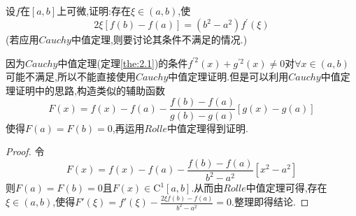 \documentclass[lang=cn,newtx,10pt,scheme=chinese]{elegantbook}
\begin{document}
\begin{exercise}
设\(f\)在\([a,b]\)上可微,证明:存在\(\xi\in(a,b)\),使
\begin{equation}
2\xi[f(b)-f(a)]=(b^{2}-a^{2})f^{\prime}(\xi)
    \nonumber
\end{equation}
(若应用$Cauchy$中值定理,则要讨论其条件不满足的情况.)
\begin{note}
    因为$Cauchy$中值定理(定理\ref{the:2.1})的条件$f^{\prime2}(x)+g^{\prime2}(x)\neq0$对$\forall x\in(a,b)$可能不满足,所以不能直接使用$Cauchy$中值定理证明.但是可以利用$Cauchy$中值定理证明中的思路,构造类似的辅助函数
    \begin{equation}
    F(x)=f(x)-f(a)-\frac{f(b)-f(a)}{g\left( b \right) -g\left( a \right)}\left[ g\left( x \right) -g\left( a \right) \right] 
        \nonumber
    \end{equation}
    使得$F(a)=F(b)=0$,再运用$Rolle$中值定理得到证明.
\end{note}
\begin{proof}
    令
    \begin{equation}
    F(x)=f(x)-f(a)-\frac{f(b)-f(a)}{b^2-a^2}\left[ x^2-a^2 \right]
        \nonumber
    \end{equation}
    则$F(a)=F(b)=0$且$F(x)\in\mathrm{C}^1[a,b]$.从而由$Rolle$中值定理可得,存在$\xi\in(a,b)$,使得$F'(\xi )=f'(\xi )-\frac{2\xi f(b)-f(a)}{b^2-a^2}=0$.整理即得结论.
\end{proof}
\end{exercise}
\end{document}
